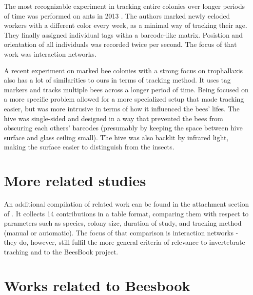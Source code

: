 The most recognizable experiment in tracking entire colonies over longer periods of time was performed on ants in 2013 \citep{mersch_tracking_2013}. The authors marked newly ecloded workers with a different color every week, as a minimal way of tracking their age. They finally assigned individual tags witha a barcode-like matrix. Posistion and orientation of all individuals was recorded twice per second. The focus of that work was interaction networks.

A recent experiment on marked bee colonies with a strong focus on trophallaxis
\citep{gernat_automated_2018} also has a lot of similarities to ours in terms of
tracking method. It uses tag markers and tracks multiple bees across a longer
period of time. Being focused on a more specific problem allowed for a more
specialized setup that made tracking easier, but was more intrusive in terms of
how it influenced the bees’ lifes. The hive was single-sided and designed in a
way that prevented the bees from obscuring each others’ barcodes (presumably by
keeping the space between hive surface and glass ceiling small). The hive was
also backlit by infrared light, making the surface easier to distinguish from
the insects. 

\section{More related studies}

An additional compilation of related work can be found in the attachment section
of \citep{schlegel_temporal_2017}. It collects 14 contributions in a table
format, comparing them with respect to parameters such as species, colony size,
duration of study, and tracking method (manual or automatic). The focus of that
comparison is interaction networks - they do, however, still fulfil the more
general criteria of relevance to invertebrate traching and to the BeesBook project.



\section{Works related to Beesbook} 

